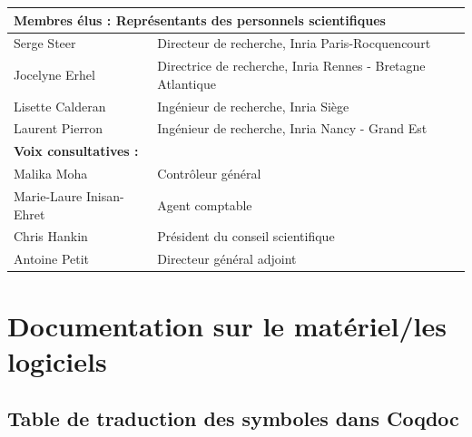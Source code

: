 \begin{tabular}{|l|p{8cm}|}
        \hline
        \multicolumn{2}{l}{\textbf{Membres élus : Représentants des personnels scientifiques}} \\
        \hline
        Serge Steer & Directeur de recherche, Inria Paris-Rocquencourt \\
        \hline
        Jocelyne Erhel & Directrice de recherche, Inria Rennes - Bretagne Atlantique \\
        \hline
        Lisette Calderan & Ingénieur de recherche, Inria Siège \\
        \hline
        Laurent Pierron & Ingénieur de recherche, Inria Nancy - Grand Est \\
        \hline
        \multicolumn{2}{l}{\textbf{Voix consultatives :}} \\
        \hline
        Malika Moha & Contrôleur général \\
        \hline
        Marie-Laure Inisan-Ehret & Agent comptable \\
        \hline
        Chris Hankin & Président du conseil scientifique \\
        \hline
        Antoine Petit & Directeur général adjoint \\
        \hline
    \end{tabular}
    \clearpage{}
  \section{Documentation sur le matériel/les logiciels}
  \subsection{Table de traduction des symboles dans Coqdoc}

